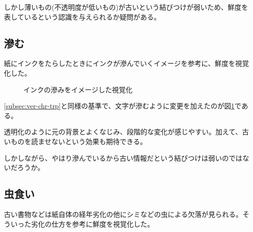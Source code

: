 しかし薄いもの(不透明度が低いもの)が古いという結びつけが弱いため、鮮度を表しているという認識を与えられるか疑問がある。

\subsection{滲む}
\label{subsec:ver-chr-bld}

紙にインクをたらしたときにインクが滲んでいくイメージを参考に、鮮度を視覚化した。

\begin{figure}[htbp]
  \begin{center}
  \end{center}
  \caption{インクの滲みをイメージした視覚化}
  \label{fig:ver-bleeding}
\end{figure}

\ref{subsec:ver-chr-trp}と同様の基準で、文字が滲むように変更を加えたのが図\ref{fig:ver-bleeding}である。

透明化のように元の背景とよくなじみ、段階的な変化が感じやすい。加えて、古いものを読ませないという効果も期待できる。

しかしながら、やはり滲んでいるから古い情報だという結びつけは弱いのではないだろうか。

\subsection{虫食い}
\label{subsec:ver-chr-wh}

古い書物などは紙自体の経年劣化の他にシミなどの虫による欠落が見られる。そういった劣化の仕方を参考に鮮度を視覚化した。

